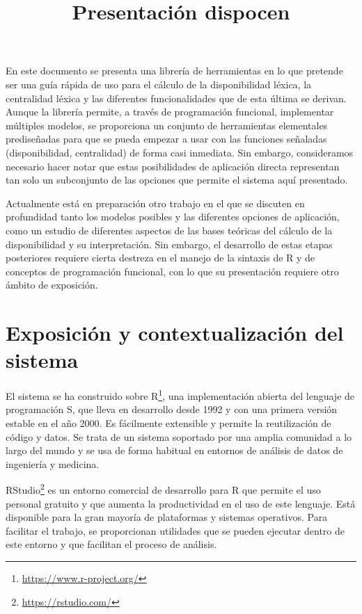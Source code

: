 \documentclass[
]{article}
\title{Presentación dispocen}
\author{}
\date{\vspace{-2.5em}}
\begin{document}
\maketitle

En este documento se presenta una librería de herramientas en lo que
pretende ser una guía rápida de uso para el cálculo de la disponibilidad
léxica, la centralidad léxica y las diferentes funcionalidades que de
esta última se derivan. Aunque la librería permite, a través de
programación funcional, implementar múltiples modelos, se proporciona un
conjunto de herramientas elementales prediseñadas para que se pueda
empezar a usar con las funciones señaladas (disponibilidad, centralidad)
de forma casi inmediata. Sin embargo, consideramos necesario hacer notar
que estas posibilidades de aplicación directa representan tan solo un
subconjunto de las opciones que permite el sistema aquí presentado.

Actualmente está en preparación otro trabajo en el que se discuten en
profundidad tanto los modelos posibles y las diferentes opciones de
aplicación, como un estudio de diferentes aspectos de las bases teóricas
del cálculo de la disponibilidad y su interpretación. Sin embargo, el
desarrollo de estas etapas posteriores requiere cierta destreza en el
manejo de la sintaxis de R y de conceptos de programación funcional, con
lo que su presentación requiere otro ámbito de exposición.

\hypertarget{exposiciuxf3n-y-contextualizaciuxf3n-del-sistema}{%
\section{Exposición y contextualización del
sistema}\label{exposiciuxf3n-y-contextualizaciuxf3n-del-sistema}}

El sistema se ha construido sobre R\footnote{\url{https://www.r-project.org/}},
una implementación abierta del lenguaje de programación S, que lleva en
desarrollo desde 1992 y con una primera versión estable en el año 2000.
Es fácilmente extensible y permite la reutilización de código y datos.
Se trata de un sistema soportado por una amplia comunidad a lo largo del
mundo y se usa de forma habitual en entornos de análisis de datos de
ingeniería y medicina.

RStudio\footnote{\url{https://rstudio.com/}} es un entorno comercial de
desarrollo para R que permite el uso personal gratuito y que aumenta la
productividad en el uso de este lenguaje. Está disponible para la gran
mayoría de plataformas y sistemas operativos. Para facilitar el trabajo,
se proporcionan utilidades que se pueden ejecutar dentro de este entorno
y que facilitan el proceso de análisis.
\end{document}
